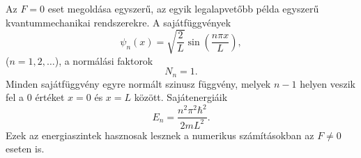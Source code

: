 Az $F=0$ eset megoldása egyszerű, az egyik legalapvetőbb példa egyszerű kvantummechanikai rendszerekre. A sajátfüggvények
\begin{equation}
	\psi_n(x) = \sqrt{\frac{2}{L}}\sin\left(\frac{n\pi x}{L}\right),
\end{equation}
($n=1,2,\dots$), a normálási faktorok
\begin{equation}
	N_n = 1.
\end{equation}
Minden sajátfüggvény egyre normált szinusz függvény, melyek $n-1$ helyen veszik fel a $0$ értéket $x=0$ és $x=L$ között. Sajátenergiáik
\begin{equation}
	E_n = \frac{n^2\pi^2\hbar^2}{2mL^2}.
\end{equation}
Ezek az energiaszintek hasznosak lesznek a numerikus számításokban az $F\neq 0$ eseten is. 
